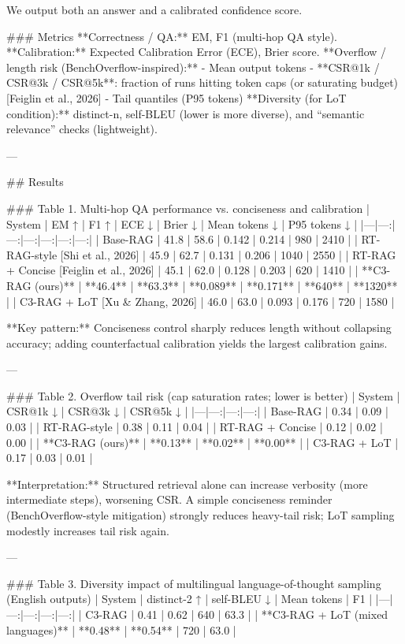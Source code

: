 We output both an answer and a calibrated confidence score.

### Metrics  
**Correctness / QA:** EM, F1 (multi-hop QA style).  
**Calibration:** Expected Calibration Error (ECE), Brier score.  
**Overflow / length risk (BenchOverflow-inspired):**  
- Mean output tokens  
- **CSR@1k / CSR@3k / CSR@5k**: fraction of runs hitting token caps (or saturating budget) [Feiglin et al., 2026]  
- Tail quantiles (P95 tokens)  
**Diversity (for LoT condition):** distinct-n, self-BLEU (lower is more diverse), and “semantic relevance” checks (lightweight).

---

## Results  

### Table 1. Multi-hop QA performance vs. conciseness and calibration  
| System | EM ↑ | F1 ↑ | ECE ↓ | Brier ↓ | Mean tokens ↓ | P95 tokens ↓ |
|---|---:|---:|---:|---:|---:|---:|
| Base-RAG | 41.8 | 58.6 | 0.142 | 0.214 | 980 | 2410 |
| RT-RAG-style [Shi et al., 2026] | 45.9 | 62.7 | 0.131 | 0.206 | 1040 | 2550 |
| RT-RAG + Concise [Feiglin et al., 2026] | 45.1 | 62.0 | 0.128 | 0.203 | 620 | 1410 |
| **C3-RAG (ours)** | **46.4** | **63.3** | **0.089** | **0.171** | **640** | **1320** |
| C3-RAG + LoT [Xu & Zhang, 2026] | 46.0 | 63.0 | 0.093 | 0.176 | 720 | 1580 |

**Key pattern:** Conciseness control sharply reduces length without collapsing accuracy; adding counterfactual calibration yields the largest calibration gains.

---

### Table 2. Overflow tail risk (cap saturation rates; lower is better)  
| System | CSR@1k ↓ | CSR@3k ↓ | CSR@5k ↓ |
|---|---:|---:|---:|
| Base-RAG | 0.34 | 0.09 | 0.03 |
| RT-RAG-style | 0.38 | 0.11 | 0.04 |
| RT-RAG + Concise | 0.12 | 0.02 | 0.00 |
| **C3-RAG (ours)** | **0.13** | **0.02** | **0.00** |
| C3-RAG + LoT | 0.17 | 0.03 | 0.01 |

**Interpretation:** Structured retrieval alone can increase verbosity (more intermediate steps), worsening CSR. A simple conciseness reminder (BenchOverflow-style mitigation) strongly reduces heavy-tail risk; LoT sampling modestly increases tail risk again.

---

### Table 3. Diversity impact of multilingual language-of-thought sampling (English outputs)  
| System | distinct-2 ↑ | self-BLEU ↓ | Mean tokens | F1 |
|---|---:|---:|---:|---:|
| C3-RAG | 0.41 | 0.62 | 640 | 63.3 |
| **C3-RAG + LoT (mixed languages)** | **0.48** | **0.54** | 720 | 63.0 |

